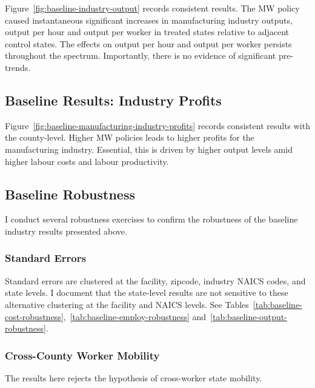 \documentclass[numsec,webpdf,contemporary,large,namedate]{oup-authoring-template}%
\begin{document}
    Figure~\ref{fig:baseline-industry-output} records consistent results. The MW policy caused instantaneous significant increases in manufacturing industry outputs, output per hour and output per worker in treated states relative to adjacent control states. The effects on output per hour and output per worker persists throughout the spectrum. Importantly, there is no evidence of significant pre-trends.
    
    

    \subsection{Baseline Results: Industry Profits}\label{subsec:baseline-results-industry-profits}
    Figure~\ref{fig:baseline-manufacturing-industry-profits} records consistent results with the county-level. Higher MW policies leads to higher profits for the manufacturing industry. Essential, this is driven by higher output levels amid higher labour costs and labour productivity.
    

    \subsection{Baseline Robustness}\label{subsec:baseline-robustness}
    I conduct several robustness exercises to confirm the robustness of the baseline industry results presented above.

    \subsubsection{Standard Errors} Standard errors are clustered at the facility, zipcode, industry NAICS codes, and state levels. I document that the state-level results are not sensitive to these alternative clustering at the facility and NAICS levels. See Tables~\ref{tab:baseline-cost-robustness},~\ref{tab:baseline-employ-robustness} and~\ref{tab:baseline-output-robustness}.
    
    
    

    \subsubsection{Cross-County Worker Mobility}\label{subsubsec:cross-county-worker-mobility}
    The results here rejects the hypothesis of cross-worker state mobility.
    
\end{document}
